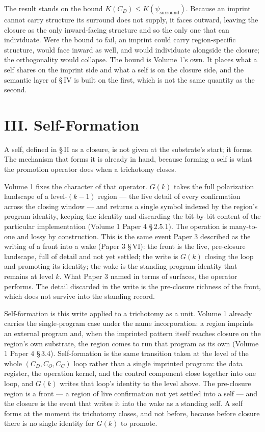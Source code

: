 \documentclass[11pt,oneside]{report}
\theoremstyle{definition}
\theoremstyle{remark}
\begin{document}
The result stands on the bound
\ensuremath{K(C_D) \le K(\psi_{\mathrm{surround}})}. Because an imprint cannot
carry structure its surround does not supply, it faces outward, leaving the
closure as the only inward-facing structure and so the only one that can
individuate. Were the bound to fail, an imprint could carry region-specific
structure, would face inward as well, and would individuate alongside the
closure; the orthogonality would collapse. The bound is Volume 1's own. It
places what a self shares on the imprint side and what a self is on the closure
side, and the semantic layer of \S\,IV is built on the first, which is not the
same quantity as the second.

\section*{III. Self-Formation}

A self, defined in \S\,II as a closure, is not given at the substrate's start;
it forms. The mechanism that forms it is already in hand, because forming a
self is what the promotion operator does when a trichotomy closes.

Volume 1 fixes the character of that operator. \ensuremath{G(k)} takes the full
polarization landscape of a level-\ensuremath{(k-1)} region --- the live detail
of every confirmation across the closing window --- and returns a single symbol
indexed by the region's program identity, keeping the identity and discarding
the bit-by-bit content of the particular implementation (Volume 1 Paper 4
\S\,2.5.1). The operation is many-to-one and lossy by construction. This is the
same event Paper 3 described as the writing of a front into a wake (Paper 3
\S\,VI): the front is the live, pre-closure landscape, full of detail and not
yet settled; the write is \ensuremath{G(k)} closing the loop and promoting its
identity; the wake is the standing program identity that remains at level
\ensuremath{k}. What Paper 3 named in terms of surfaces, the operator performs.
The detail discarded in the write is the pre-closure richness of the front,
which does not survive into the standing record.

Self-formation is this write applied to a trichotomy as a unit. Volume 1
already carries the single-program case under the name incorporation: a region
imprints an external program and, when the imprinted pattern itself reaches
closure on the region's own substrate, the region comes to run that program as
its own (Volume 1 Paper 4 \S\,3.4). Self-formation is the same transition taken
at the level of the whole \ensuremath{(C_D, C_O, C_C)} loop rather than a single
imprinted program: the data register, the operation kernel, and the control
component close together into one loop, and \ensuremath{G(k)} writes that loop's
identity to the level above. The pre-closure region is a front --- a region of
live confirmation not yet settled into a self --- and the closure is the event
that writes it into the wake as a standing self. A self forms at the moment its
trichotomy closes, and not before, because before closure there is no single
identity for \ensuremath{G(k)} to promote.
\end{document}
